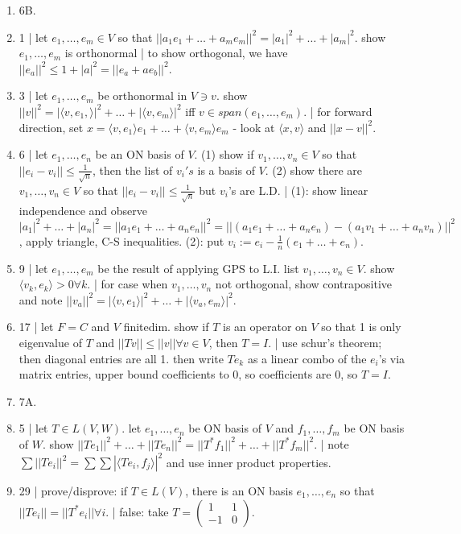 \begin{enumerate}
	\item 6B. 
	\item 1 | let $e_1,\dots,e_m \in V$ so that $||a_1e_1 + \dots + a_me_m||^2 = |a_1|^2 + \dots + |a_m|^2$. show $e_1,\dots,e_m$ is orthonormal | to show orthogonal, we have $||e_a||^2 \leq 1 + |a|^2 = ||e_a + ae_b||^2$. 
	\item 3 | let $e_1,\dots,e_m$ be orthonormal in $V \ni v$. show $||v||^2 = |\langle v,e_1, \rangle|^2 + \dots + |\langle v,e_m \rangle|^2$ iff $v \in span(e_1,\dots,e_m)$. | for forward direction, set $x = \langle v,e_1 \rangle e_1 + \dots + \langle v,e_m \rangle e_m$ - look at $\langle x,v \rangle$ and $||x-v||^2$. 
	\item 6 | let $e_1,\dots,e_n$ be an ON basis of $V$. (1) show if $v_1,\dots,v_n \in V$ so that $||e_i - v_i || \leq \frac{1}{\sqrt{n}}$, then the list of $v_i's$ is a basis of $V$. (2) show there are $v_1,\dots,v_n \in V$ so that $||e_i - v_i|| \leq \frac{1}{\sqrt{n}}$ but $v_i$'s are L.D. | (1): show linear independence and observe $|a_1|^2 + \dots + |a_n|^2 = ||a_1e_1 + \dots + a_ne_n||^2 = ||(a_1e_1 + \dots + a_ne_n) - (a_1v_1 + \dots + a_nv_n)||^2$, apply triangle, C-S inequalities. (2): put $v_i := e_i - \frac{1}{n}(e_1 + \dots + e_n)$. 
	\item 9 | let $e_1,\dots,e_m$ be the result of applying GPS to L.I. list $v_1,\dots,v_n \in V$. show $\langle v_k,e_k \rangle > 0 \forall k$. | for case when $v_1,\dots,v_n$ not orthogonal, show contrapositive and note $||v_a||^2 = |\langle v,e_1 \rangle|^2 + \dots + |\langle v_a,e_m \rangle|^2$. 
	\item 17 | let $F=C$ and $V$ finitedim. show if $T$ is an operator on $V$ so that 1 is only eigenvalue of $T$ and $||Tv|| \leq ||v|| \forall v \in V$, then $T=I$. | use schur's theorem; then diagonal entries are all 1. then write $Te_k$ as a linear combo of the $e_i$'s via matrix entries, upper bound coefficients to 0, so coefficients are 0, so $T=I$. 
	\item 7A. 
	\item 5 | let $T \in L(V,W)$. let $e_1,\dots,e_n$ be ON basis of $V$ and $f_1,\dots,f_m$ be ON basis of $W$. show $||Te_1||^2 + \dots + ||Te_n||^2 = ||T^*f_1||^2 + \dots + ||T^*f_m||^2$. | note $\sum ||Te_i||^2 = \sum \sum |\langle Te_i,f_j \rangle|^2$ and use inner product properties. 
	\item 29 | prove/disprove: if $T \in L(V)$, there is an ON basis $e_1,\dots,e_n$ so that $||Te_i|| = ||T^*e_i|| \forall i$. | false: take $T = \begin{pmatrix} 1 & 1 \\ -1 & 0 \end{pmatrix}$. 

\end{enumerate}
